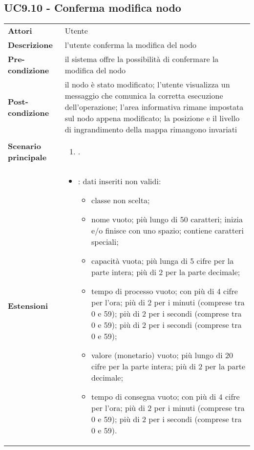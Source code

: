 \subsection{UC9.10 - Conferma modifica nodo} 
\label{sssec:UC9.10} 
\def\arraystretch{1.5}
\begin{tabularx}{\textwidth}{l|p{}}
	\rowcolor{I} \multicolumn{2}{c}{\color{white}\textbf{UC9.10 - Conferma modifica nodo}} \\
	\toprule
	\endhead
	\textbf{Attori} & Utente\\
	\textbf{Descrizione} & l'utente conferma la modifica del nodo\\
	\textbf{Pre-condizione} & il sistema offre la possibilità di confermare la modifica del nodo\\
	\textbf{Post-condizione} & il nodo è stato modificato;  l'utente visualizza un messaggio che comunica la corretta esecuzione dell'operazione; l'area informativa rimane impostata sul nodo appena modificato; la posizione e il livello di ingrandimento della mappa rimangono invariati\\
	\textbf{Scenario principale} & \vspace{-1.2em}\begin{enumerate}[leftmargin=*,noitemsep,nosep]
		\item \nameref{sssec:UC9.10}.
	\end{enumerate}\\
	\textbf{Estensioni} & \vspace{-1.2em}\begin{itemize}[leftmargin=*,noitemsep,nosep]
		\item \nameref{sssec:UC9.11}: dati inseriti non validi:
		\begin{itemize}
			\item classe non scelta;
			\item nome vuoto; più lungo di 50
			caratteri; inizia e/o finisce con uno spazio; contiene caratteri
			speciali;
			\item capacità vuota; più lunga di 5
			cifre per la parte intera; più di 2 per la parte decimale;
			\item tempo di processo vuoto;
			con più di 4 cifre per l'ora; più di 2 per i minuti (comprese tra
			0 e 59); più di 2 per i secondi (comprese tra 0 e 59); più di 2
			per i secondi (comprese tra 0 e 59);
			\item valore (monetario) vuoto; più
			lungo di 20 cifre per la parte intera; più di 2 per la parte
			decimale;
			\item tempo di consegna vuoto;
			con più di 4 cifre per l'ora; più di 2 per i minuti (comprese tra
			0 e 59); più di 2 per i secondi (comprese tra 0 e 59).
		\end{itemize}
	\end{itemize}\\
	\bottomrule
\end{tabularx}

